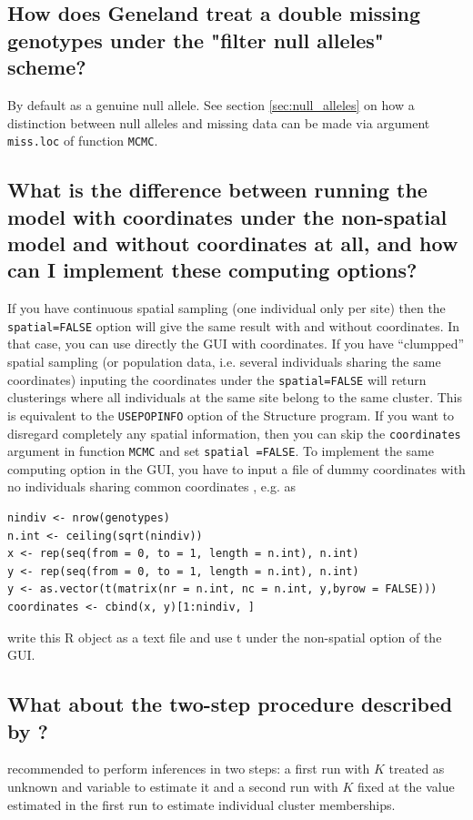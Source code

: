 \documentclass{article}
\begin{document}
\subsection[Null alleles]{How does {\sc Geneland} treat a double missing genotypes under the "filter null alleles" scheme?}
By default as a genuine null allele. 
See section \ref{sec:null_alleles} on how a distinction between null alleles and missing data can be made 
via argument \texttt{miss.loc} of function \texttt{MCMC}. 

\subsection[Non spatial model with coordiantes]{What is the difference between running the model with 
coordinates under the non-spatial 
model and without coordinates at all, and how can I implement these computing options?}


If you have continuous spatial sampling (one individual only per site)
then the {\tt spatial=FALSE} option will give the same result with and without coordinates.
In that case, you can use directly the GUI with coordinates.
If you have ``clumpped'' spatial sampling (or population data, i.e. several individuals sharing the same coordinates) 
inputing the coordinates under  the {\tt spatial=FALSE} will return clusterings where
all individuals at the same site belong to the same cluster. This is equivalent to the {\tt USEPOPINFO} option of the 
{\sc Structure} program. If you want to disregard completely any spatial information, then  you can skip the 
{\tt coordinates} argument in function {\tt MCMC} and set
 {\tt spatial =FALSE}. To implement the same computing option in the GUI, you have to input a file of dummy coordinates 
with no individuals sharing common coordinates , e.g. as 
\begin{verbatim}
nindiv <- nrow(genotypes)
n.int <- ceiling(sqrt(nindiv))
x <- rep(seq(from = 0, to = 1, length = n.int), n.int)
y <- rep(seq(from = 0, to = 1, length = n.int), n.int)
y <- as.vector(t(matrix(nr = n.int, nc = n.int, y,byrow = FALSE)))
coordinates <- cbind(x, y)[1:nindiv, ]
\end{verbatim}



write this R object as a text file and use t under the non-spatial option of the GUI.

\subsection[One run only to estimate $K$]{What about the two-step procedure described by \citet{Guillot05a}?}
\citet{Guillot05a} recommended to perform inferences in two steps: a first run with $K$ treated as unknown and variable 
to estimate it and a second run with $K$ fixed at the value estimated in the first run to estimate individual cluster memberships. 
\end{document}
